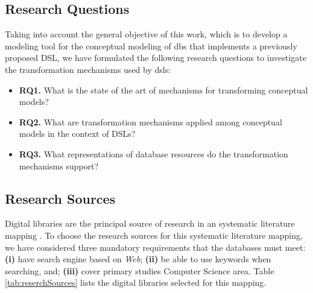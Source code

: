 \subsection{Research Questions} \label{ssec_slm:researchQuestions}

Taking into account the general objective of this work, which is to develop a modeling tool for the conceptual modeling of \acp{db} that implements a previously proposed DSL, we have formulated the following research questions to investigate the transformation mechanisms used by \acp{dsl}:

\begin{itemize}
    \item \textbf{RQ1.} What is the state of the art of mechanisms for transforming conceptual models?
    \item \textbf{RQ2.} What are transformation mechanisms applied among conceptual models in the context of DSLs?
    \item \textbf{RQ3.} What representations of database resources do the transformation mechanisms support?
\end{itemize}

\subsection{Research Sources} \label{ssec_slm:researchSources}

Digital libraries are the principal source of research in an systematic literature mapping \cite{Petersen:2008}.
To choose the research sources for this systematic literature mapping, we have considered three mandatory requirements that the databases must meet:
\textbf{(i)} have search engine based on \textit{Web};
\textbf{(ii)} be able to use keywords when searching, and;
\textbf{(iii)} cover primary studies Computer Science area.
Table \ref{tab:reserchSources} lists the digital libraries selected for this mapping.
        
